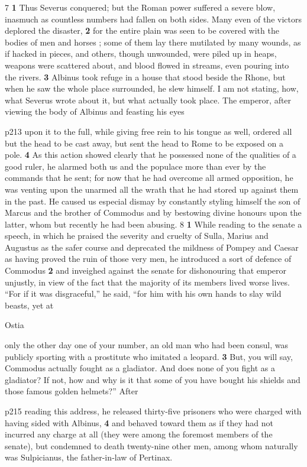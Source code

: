 7 \textbf{1} Thus Severus conquered; but the Roman power suffered a severe blow, inasmuch as countless numbers had fallen on both sides. Many even of the victors deplored the disaster, \textbf{2} for the entire plain was seen to be covered with the bodies of men and horses ; some of them lay there mutilated by many wounds, as if hacked in pieces, and others, though unwounded, were piled up in heaps, weapons were scattered about, and blood flowed in streams, even pouring into the rivers. \textbf{3} Albinus took refuge in a house that stood beside the Rhone, but when he saw the whole place surrounded, he slew himself. I am not stating, how, what Severus wrote about it, but what actually took place. The emperor, after viewing the body of Albinus and feasting his eyes

p213 upon it to the full, while giving free rein to his tongue as well, ordered all but the head to be cast away, but sent the head to Rome to be exposed on a pole. \textbf{4} As this action showed clearly that he possessed none of the qualities of a good ruler, he alarmed both us and the populace more than ever by the commands that he sent; for now that he had overcome all armed opposition, he was venting upon the unarmed all the wrath that he had stored up against them in the past. He caused us especial dismay by constantly styling himself the son of Marcus and the brother of Commodus and by bestowing divine honours upon the latter, whom but recently he had been abusing. 8 \textbf{1} While reading to the senate a speech, in which he praised the severity and cruelty of Sulla, Marius and Augustus as the safer course and deprecated the mildness of Pompey and Caesar as having proved the ruin of those very men, he introduced a sort of defence of Commodus \textbf{2} and inveighed against the senate for dishonouring that emperor unjustly, in view of the fact that the majority of its members lived worse lives. ``For if it was disgraceful,'' he said, ``for him with his own hands to slay wild beasts, yet at

Ostia

only the other day one of your number, an old man who had been consul, was publicly sporting with a prostitute who imitated a leopard. \textbf{3} But, you will say, Commodus actually fought as a gladiator. And does none of you fight as a gladiator? If not, how and why is it that some of you have bought his shields and those famous golden helmets?'' After

p215 reading this address, he released thirty-five prisoners who were charged with having sided with Albinus, \textbf{4} and behaved toward them as if they had not incurred any charge at all (they were among the foremost members of the senate), but condemned to death twenty-nine other men, among whom naturally was Sulpicianus, the father-in\texthebrew{‑}law of Pertinax.

